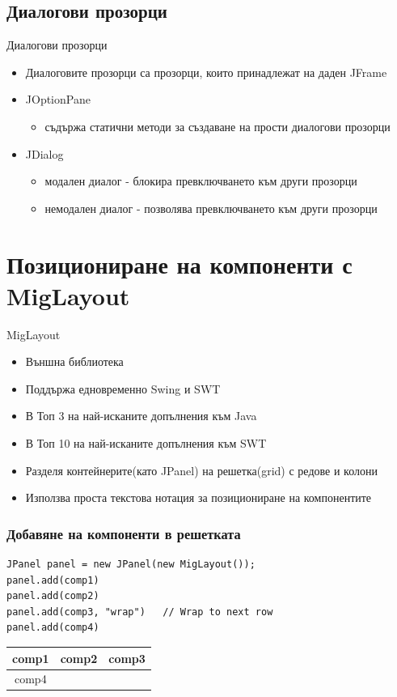 \documentclass{beamer}
\begin{document}
\subsection{Диалогови прозорци}
\begin{frame}{Диалогови прозорци}
  \transdissolve
  \begin{itemize}
    \item Диалоговите прозорци са прозорци, които принадлежат на даден JFrame
  \item JOptionPane
    \begin{itemize}
      \item съдържа статични методи за създаване на прости диалогови прозорци
    \end{itemize}
  \item JDialog
    \begin{itemize}
      \item модален диалог - блокира превключването към други прозорци
      \item немодален диалог - позволява превключването към други прозорци
    \end{itemize}
  \end{itemize}
\end{frame}

\section{Позициониране на компоненти с MigLayout}
\begin{frame}{MigLayout}
  \transdissolve
  \begin{itemize}
  \item Външна библиотека
  \item Поддържа едновременно Swing и SWT
  \item В Топ 3 на най-исканите допълнения към Java
  \item В Топ 10 на най-исканите допълнения към SWT
  \item Разделя контейнерите(като JPanel) на решетка(grid) с редове и колони
  \item Използва проста текстова нотация за позициониране на компонентите
  \end{itemize}
\end{frame}

\begin{frame}[fragile]
  \frametitle{Добавяне на компоненти в решетката}
  \transdissolve
\begin{lstlisting}
JPanel panel = new JPanel(new MigLayout());
panel.add(comp1)
panel.add(comp2)
panel.add(comp3, "wrap")   // Wrap to next row
panel.add(comp4)  
\end{lstlisting}
\begin{tabular}{|c|c|c|}
  \hline
  comp1 & comp2 & comp3 \\
  \hline 
  comp4 &  & \\  
  \hline
\end{tabular}

\end{frame}
\end{document}
